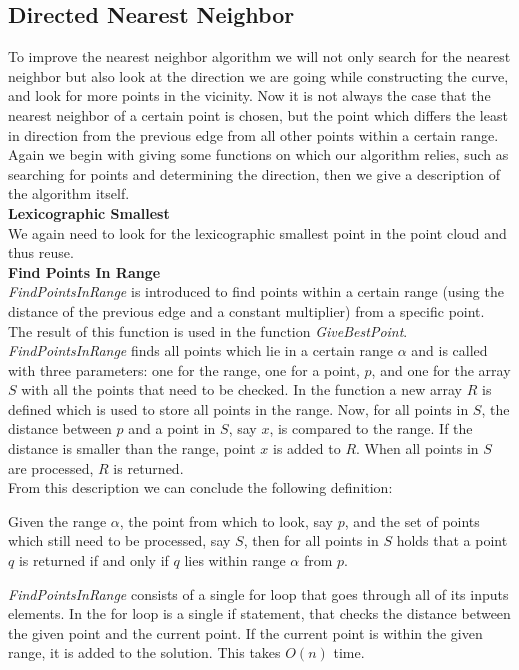 \subsection{Directed Nearest Neighbor}
\label{sub:directed_nearest_neighbor}
To improve the nearest neighbor algorithm we will not only search for the nearest neighbor but also look at the direction we are going while constructing the curve, and look for more points in the vicinity. Now it is not always the case that the nearest neighbor of a certain point is chosen, but the point which differs the least in direction from the previous edge from all other points within a certain range.
Again we begin with giving some functions on which our algorithm relies, such as searching for points and determining the direction, then we give a description of the algorithm itself.\\

 \noindent\textbf{Lexicographic Smallest}\\
    We again need to look for the lexicographic smallest point in the point cloud and thus reuse.\\

  \noindent\textbf{Find Points In Range}\\
    \textit{FindPointsInRange} is introduced to find points within a certain range (using the distance of the previous edge and a constant multiplier) from a specific point. The result of this function is used in the function \textit{GiveBestPoint}.
    \noindent\emph{FindPointsInRange} finds all points which lie in a certain range $\alpha$ and is called with three parameters: one for the range, one for a point, $p$, and one for the array $S$ with all the points that need to be checked. In the function a new array $R$ is defined which is used to store all points in the range. Now, for all points in $S$, the distance between $p$ and a point in $S$, say $x$, is compared to the range. If the distance is smaller than the range, point $x$ is added to $R$. When all points in $S$ are processed, $R$ is returned.\\
    From this description we can conclude the following definition:\\
      \begin{definition} \label{def:fpir}
          Given the range $\alpha$, the point from which to look, say $p$, and the set of points which still need to be processed, say $S$, then for all points in $S$ holds that a point $q$ is returned if and only if $q$ lies within range $\alpha$ from $p$.
      \end{definition}
    \noindent\emph{FindPointsInRange} consists of a single for loop that goes through all of its inputs elements. In the for loop is a single if statement, that checks the distance between the given point and the current point. If the current point is within the given range, it is added to the solution.
    This takes $O(n)$ time.\\

